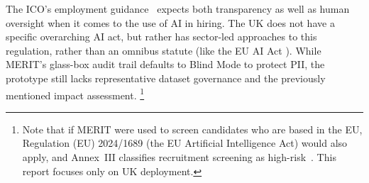 The ICO's employment guidance~\cite{ico_employment_2023} expects both transparency as well as human oversight when it comes to the 
use of AI in hiring. The UK does not have a specific overarching AI act, but rather has sector-led approaches to this regulation,
rather than an omnibus statute (like the EU AI Act \cite{eu_ai_act_2024}). While MERIT's glass-box audit trail defaults to Blind
Mode to protect PII, the prototype still lacks representative dataset governance and the previously mentioned impact assessment.
\footnote{Note that if MERIT were used to screen candidates who are
based in the EU, Regulation (EU) 2024/1689 (the EU Artificial Intelligence Act) would also apply, and Annex~III classifies recruitment
screening as high-risk~\cite{eu_ai_act_2024}. This report focuses only on UK deployment.}
